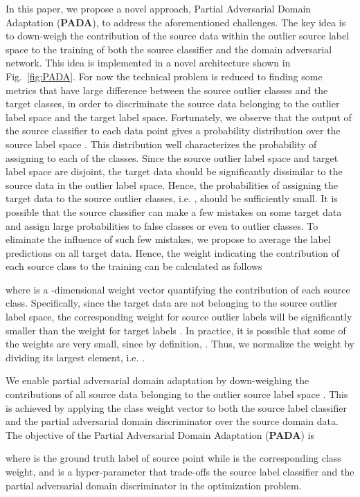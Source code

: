 \documentclass[runningheads]{llncs}
\begin{document}
In this paper, we propose a novel approach, Partial Adversarial Domain Adaptation (\textbf{PADA}), to address the aforementioned challenges. The key idea is to down-weigh the contribution of the source data within the outlier source label space  to the training of both the source classifier and the domain adversarial network. This idea is implemented in a novel architecture shown in Fig.~\ref{fig:PADA}. For now the technical problem is reduced to finding some metrics that have large difference between the source outlier classes and the target classes, in order to discriminate the source data belonging to the outlier label space and the target label space. Fortunately, we observe that the output of the source classifier   to each data point  gives a probability distribution over the source label space . This distribution well characterizes the probability of assigning  to each of the  classes. Since the source outlier label space and target label space are disjoint, the target data should be significantly dissimilar to the source data in the outlier label space. Hence, the probabilities of assigning the target data to the source outlier classes, i.e. , should be sufficiently small. It is possible that the source classifier can make a few mistakes on some target data and assign large probabilities to false classes or even to outlier classes. To eliminate the influence of such few mistakes, we propose to average the label predictions  on all target data. 
Hence, the weight indicating the contribution of each source class to the training can be calculated as follows

where  is a -dimensional weight vector quantifying the contribution of each source class. Specifically, since the target data are not belonging to the source outlier label space, the corresponding weight for source outlier labels  will be significantly smaller than the weight for target labels . In practice, it is possible that some of the weights are very small, since by definition, . Thus, we normalize the weight  by dividing its largest element, i.e. . 

We enable partial adversarial domain adaptation by down-weighing the contributions of all source data belonging to the outlier source label space . This is achieved by applying the class weight vector  to both the source label classifier and the partial adversarial domain discriminator over the source domain data. The objective of the Partial Adversarial Domain Adaptation (\textbf{PADA}) is
  
where  is the ground truth label of source point  while  is the corresponding class weight, and  is a hyper-parameter that trade-offs the source label classifier and the partial adversarial domain discriminator in the optimization problem.
\end{document}
